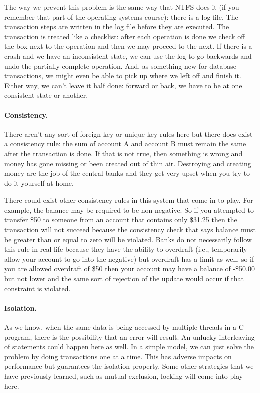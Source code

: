 \documentclass[a4paper]{report}
\begin{document}
The way we prevent this problem is the same way that NTFS does it (if you remember that part of the operating systems course): there is a log file. The transaction steps are written in the log file before they are executed. The transaction is treated like a checklist: after each operation is done we check off the box next to the operation and then we may proceed to the next. If there is a crash and we have an inconsistent state, we can use the log to go backwards and undo the partially complete operation. And, as something new for database transactions, we might even be able to pick up where we left off and finish it. Either way, we can't leave it half done: forward or back, we have to be at one consistent state or another.


\paragraph{Consistency.} There aren't any sort of foreign key or unique key rules here but there does exist a consistency rule: the sum of account A and account B must remain the same after the transaction is done. If that is not true, then something is wrong and money has gone missing or been created out of thin air. Destroying and creating money are the job of the central banks and they get very upset when you try to do it yourself at home. 

There could exist other consistency rules in this system that come in to play. For example, the balance may be required to be non-negative. So if you attempted to transfer \$50 to someone from an account that contains only \$31.25 then the transaction will not succeed because the consistency check that says balance must be greater than or equal to zero will be violated. Banks do not necessarily follow this rule in real life because they have the ability to overdraft (i.e., temporarily allow your account to go into the negative) but overdraft has a limit as well, so if you are allowed overdraft of \$50 then your account may have a balance of -\$50.00 but not lower and the same sort of rejection of the update would occur if that constraint is violated.

\paragraph{Isolation.} As we know, when the same data is being accessed by multiple threads in a C program, there is the possibility that an error will result. An unlucky interleaving of statements could happen here as well. In a simple model, we can just solve the problem by doing transactions one at a time. This has adverse impacts on performance but guarantees the isolation property. Some other strategies that we have previously learned, such as mutual exclusion, locking will come into play here. 
\end{document}

